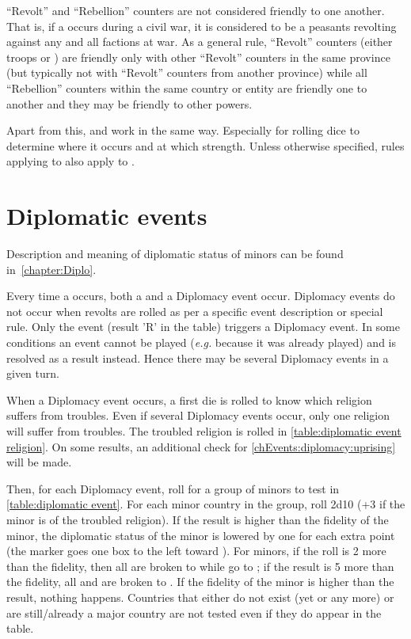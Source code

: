 \aparag ``Revolt'' and ``Rebellion'' counters are not considered
friendly to one another. That is, if a \RD occurs during a civil war, it
is considered to be a peasants revolting against any and all factions at
war.
\bparag As a general rule, ``Revolt'' counters (either troops or
\REVOLT) are friendly only with other ``Revolt'' counters in the same
province (but typically not with ``Revolt'' counters from another
province) while all ``Rebellion'' counters within the same country or
entity are friendly one to another and they may be friendly to other
powers.

\aparag Apart from this, \REVOLT and \REBELLION work in the same
way. Especially for rolling dice to determine where it occurs and at
which strength.
\bparag Unless otherwise specified, rules applying to \REVOLT also apply
to \REBELLION.



\section{Diplomatic events}\label{chEvents:diplomacy}

\begin{designnote}
  Description and meaning of diplomatic status of minors can be found
  in~\ref{chapter:Diplo}.
\end{designnote}

\aparag Every time a \RD occurs, both a \REVOLT and a Diplomacy event
occur.
\bparag Diplomacy events do not occur when revolts are rolled as per a
specific event description or special rule. Only the \RD event (result
'R' in the table) triggers a Diplomacy event.
\bparag In some conditions an event cannot be played (\emph{e.g.}
because it was already played) and is resolved as a \RD result
instead. Hence there may be several Diplomacy events in a given turn.

 When a Diplomacy event occurs, a first die
is rolled to know which religion suffers from troubles.
\bparag Even if several Diplomacy events occur, only one religion will
suffer from troubles.
\bparag The troubled religion is rolled in \ref{table:diplomatic event
  religion}.
\bparag On some results, an additional check for
\ref{chEvents:diplomacy:uprising} will be made.

 Then, for each Diplomacy event, roll for a
group of minors to test in \ref{table:diplomatic event}.
\bparag For each minor country in the group, roll 2d10 (+3 if the
minor is of the troubled religion).
\bparag If the result is higher than the fidelity of the minor, the
diplomatic status of the minor is lowered by one for each extra point
(the marker goes one box to the left toward \Neutral).
\bparag For \ROTW minors, if the roll is 2 more than the fidelity,
then all \dipFR are broken to \dipNR while \dipAT go to \dipFR ; if
the result is 5 more than the fidelity, all \dipAT and \dipFR are
broken to \dipNR.
\bparag If the fidelity of the minor is higher than the result, nothing
happens.
\bparag Countries that either do not exist (yet or any more) or are
still/already a major country are not tested even if they do appear in
the table.

